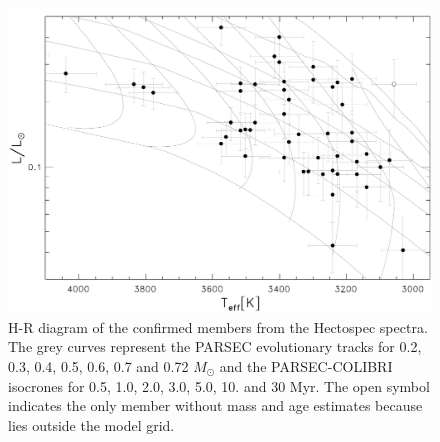\documentclass[12pt]{article}
\begin{document}
\begin{figure}[ht!]
	\includegraphics[width=1.0\textwidth]{HR_Hectospec.pdf}
	\caption[H-R diagram of the so far confirmed members from the Hectospec spectra.]{H-R diagram of the confirmed members from the Hectospec spectra. The grey curves represent the PARSEC evolutionary tracks for 0.2, 0.3, 0.4, 0.5, 0.6, 0.7 and 0.72 $M_\odot$ and the PARSEC-COLIBRI isocrones for 0.5, 1.0, 2.0, 3.0, 5.0, 10. and 30 Myr. The open symbol indicates the only member without mass and age estimates because lies outside the model grid.}
	\label{fig_Hectospec:HR}
\end{figure}



\end{document}
